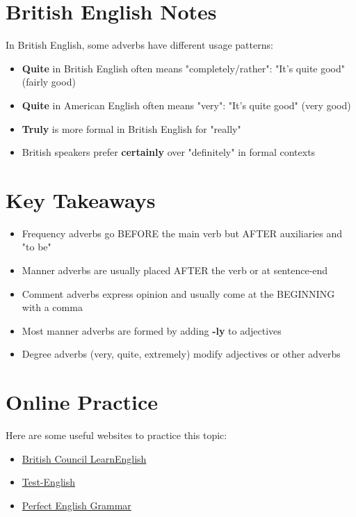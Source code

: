 \section{British English Notes}

In British English, some adverbs have different usage patterns:
\begin{itemize}
    \item \textbf{Quite} in British English often means "completely/rather": "It's quite good" (fairly good)
    \item \textbf{Quite} in American English often means "very": "It's quite good" (very good)
    \item \textbf{Truly} is more formal in British English for "really"
    \item British speakers prefer \textbf{certainly} over "definitely" in formal contexts
\end{itemize}

\section{Key Takeaways}
\begin{itemize}
    \item Frequency adverbs go BEFORE the main verb but AFTER auxiliaries and "to be"
    \item Manner adverbs are usually placed AFTER the verb or at sentence-end
    \item Comment adverbs express opinion and usually come at the BEGINNING with a comma
    \item Most manner adverbs are formed by adding \textbf{-ly} to adjectives
    \item Degree adverbs (very, quite, extremely) modify adjectives or other adverbs
\end{itemize}


\section{Online Practice}
Here are some useful websites to practice this topic:
\begin{itemize}
    \item \href{https://learnenglish.britishcouncil.org/grammar/a1-a2-grammar/adverbs-frequency}{British Council LearnEnglish}
    \item \href{https://test-english.com/grammar-points/a1/adverbs-frequency/}{Test-English}
    \item \href{https://www.perfect-english-grammar.com/adverbs-of-frequency-exercise-1.html}{Perfect English Grammar}
\end{itemize}
